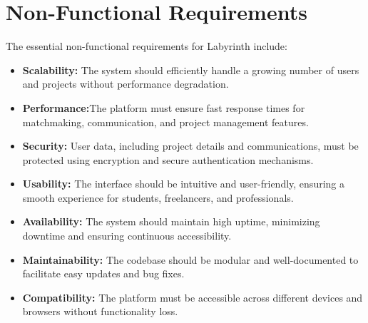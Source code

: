 \documentclass{FastFyp}
\begin{document}
\section{Non-Functional Requirements}
The essential non-functional requirements for Labyrinth include:
\begin{itemize}
    \item \textbf{Scalability:} The system should efficiently handle a growing number of users and projects without performance degradation.
    \item \textbf{Performance:}The platform must ensure fast response times for matchmaking, communication, and project management features.
    \item \textbf{Security:} User data, including project details and communications, must be protected using encryption and secure authentication mechanisms.
    \item \textbf{Usability:} The interface should be intuitive and user-friendly, ensuring a smooth experience for students, freelancers, and professionals.
    \item \textbf{Availability:} The system should maintain high uptime, minimizing downtime and ensuring continuous accessibility.
    \item \textbf{Maintainability:} The codebase should be modular and well-documented to facilitate easy updates and bug fixes.
    \item \textbf{Compatibility:} The platform must be accessible across different devices and browsers without functionality loss.
\end{itemize}
\end{document}
